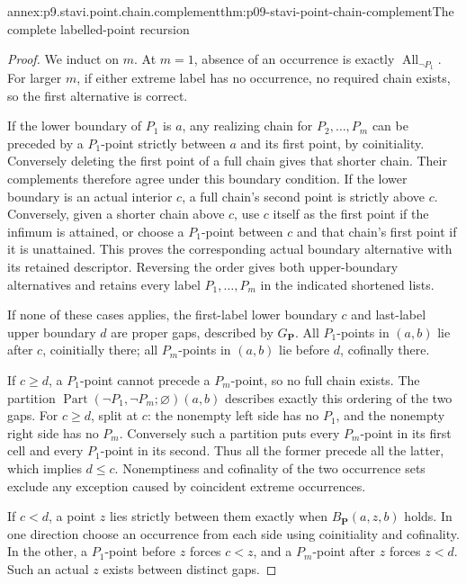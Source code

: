 \begin{annexitem}{annex:p9.stavi.point.chain.complement}{thm:p09-stavi-point-chain-complement}{The complete labelled-point recursion}
\begin{proof}
We induct on \(m\). At \(m=1\), absence of an
occurrence is exactly \(\operatorname{All}_{\neg P_1}\).
For larger \(m\), if either extreme label
has no occurrence, no required chain exists,
so the first alternative is correct.

If the lower boundary of \(P_1\) is \(a\),
any realizing chain for \(P_2,\ldots,P_m\)
can be preceded by a \(P_1\)-point strictly
between \(a\) and its first point, by
coinitiality. Conversely deleting the
first point of a full chain gives that
shorter chain. Their complements therefore
agree under this boundary condition.
If the lower boundary is an actual
interior \(c\), a full chain's second
point is strictly above \(c\). Conversely,
given a shorter chain above \(c\), use
\(c\) itself as the first point if the
infimum is attained, or choose a
\(P_1\)-point between \(c\) and that
chain's first point if it is unattained.
This proves the corresponding actual
boundary alternative with its retained
descriptor. Reversing the order gives
both upper-boundary alternatives and
retains every label \(P_1,\ldots,P_m\)
in the indicated shortened lists.

If none of these cases applies, the
first-label lower boundary \(c\) and
last-label upper boundary \(d\) are
proper gaps, described by
\(G_{\mathbf P}\). All \(P_1\)-points
in \((a,b)\) lie after \(c\), coinitially there;
all \(P_m\)-points in \((a,b)\) lie before \(d\),
cofinally there.

If \(c\geq d\), a \(P_1\)-point
cannot precede a \(P_m\)-point,
so no full chain exists.
The partition
\(\operatorname{Part}(\neg P_1,\neg P_m;\varnothing)(a,b)\)
describes exactly this ordering of
the two gaps. For \(c\geq d\),
split at \(c\): the nonempty
left side has no \(P_1\),
and the nonempty right side
has no \(P_m\).
Conversely such a partition
puts every \(P_m\)-point
in its first cell and every
\(P_1\)-point in its second.
Thus all the former precede
all the latter, which implies
\(d\leq c\). Nonemptiness
and cofinality of the two
occurrence sets exclude any
exception caused by coincident
extreme occurrences.

If \(c<d\), a point \(z\)
lies strictly between them
exactly when \(B_{\mathbf P}(a,z,b)\)
holds. In one direction choose
an occurrence from each
side using coinitiality and
cofinality. In the other,
a \(P_1\)-point before \(z\)
forces \(c<z\), and a
\(P_m\)-point after \(z\)
forces \(z<d\). Such
an actual \(z\) exists
between distinct gaps.


\end{proof}
\end{annexitem}
